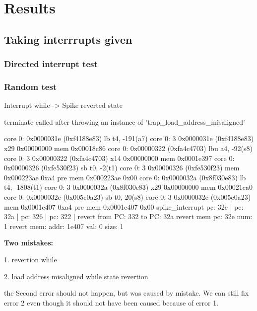 \chapter{Results}


\section{Taking interrrupts given }

\subsection{Directed interrupt test}


\subsection{Random test}


Interrupt while 
-> Spike reverted state

\begin{terminal}
terminate called after throwing an instance of 'trap_load_address_misaligned'
\end{terminal}


\begin{terminal}
core   0: 0x0000031e (0xf4188e83) lb      t4, -191(a7)
core   0: 3 0x0000031e (0xf4188e83) x29 0x00000000 mem 0x00018c86
core   0: 0x00000322 (0xfa4c4703) lbu     a4, -92(s8)
core   0: 3 0x00000322 (0xfa4c4703) x14 0x00000000 mem 0x0001e397
core   0: 0x00000326 (0xfe530f23) sb      t0, -2(t1)
core   0: 3 0x00000326 (0xfe530f23) mem 0x000223ae 0xa4 pre mem 0x000223ae 0x00
core   0: 0x0000032a (0x8f030e83) lb      t4, -1808(t1)
core   0: 3 0x0000032a (0x8f030e83) x29 0x00000000 mem 0x00021ca0
core   0: 0x0000032e (0x005c0a23) sb      t0, 20(s8)
core   0: 3 0x0000032e (0x005c0a23) mem 0x0001e407 0xa4 pre mem 0x0001e407 0x00
spike_interrupt
pc: 32e | pc: 32a | pc: 326 | pc: 322 | 
revert from PC: 332 to PC: 32a
revert mem pc: 32e num: 1
revert mem: addr: 1e407 val: 0 size: 1
\end{terminal}

\textbf{Two mistakes:}

1. revertion while  

2. load address misaligned while state revertion


the Second error should not happen, but was caused by mistake. We can still fix error 2 even though it should not have been caused because of error 1.




